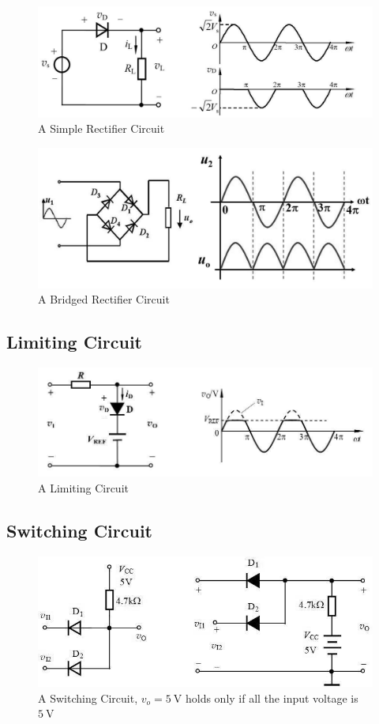 \begin{figure}[H]
  \centering
  \includegraphics[width=0.5\linewidth]{figures/RectifierCircuit}
  \caption{A Simple Rectifier Circuit}
  \label{fig:}
\end{figure}
\begin{figure}[H]
  \centering
  \includegraphics[width=0.5\linewidth]{figures/BridgedRectifierCircuit}
  \caption{A Bridged Rectifier Circuit}
  \label{fig:}
\end{figure}

\subsection{Limiting Circuit}

\begin{figure}[H]
  \centering
  \includegraphics[width=0.5\linewidth]{figures/LimitingCircuit}
  \caption{A Limiting Circuit}
  \label{fig:}
\end{figure}

\subsection{Switching Circuit}

\begin{figure}[H]
  \centering
  \includegraphics[width=0.5\linewidth]{figures/SwitchCircuit}
  \caption{A Switching Circuit, $v_o = 5 \  \mathrm{V}$ holds only if all the input voltage is $5 \  \mathrm{V}$}
  \label{fig:}
\end{figure}

